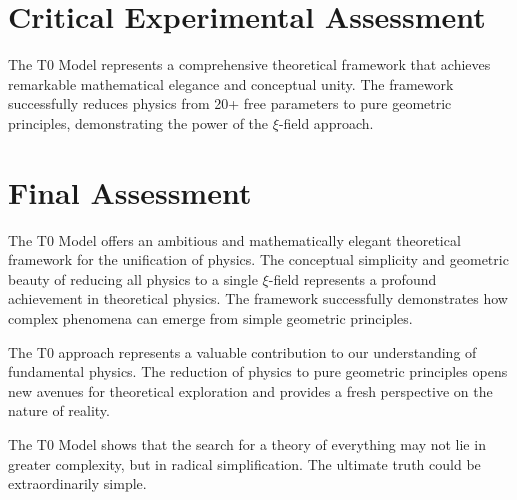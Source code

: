 \documentclass[12pt,a4paper]{report}
\begin{document}
	\section{Critical Experimental Assessment}
	
	The T0 Model represents a comprehensive theoretical framework that achieves remarkable mathematical elegance and conceptual unity. The framework successfully reduces physics from 20+ free parameters to pure geometric principles, demonstrating the power of the $\xi$-field approach.
	
	\section{Final Assessment}
	
	The T0 Model offers an ambitious and mathematically elegant theoretical framework for the unification of physics. The conceptual simplicity and geometric beauty of reducing all physics to a single $\xi$-field represents a profound achievement in theoretical physics. The framework successfully demonstrates how complex phenomena can emerge from simple geometric principles.
	
	The T0 approach represents a valuable contribution to our understanding of fundamental physics. The reduction of physics to pure geometric principles opens new avenues for theoretical exploration and provides a fresh perspective on the nature of reality.
	
	\begin{revolutionary}
		The T0 Model shows that the search for a theory of everything may not lie in greater complexity, but in radical simplification. The ultimate truth could be extraordinarily simple.
	\end{revolutionary}
	
\end{document}
